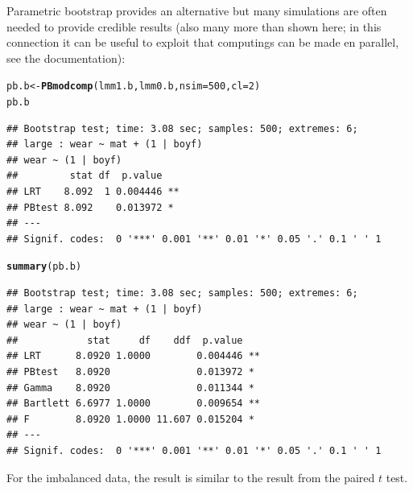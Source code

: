 \documentclass[11pt]{article}\usepackage[]{graphicx}\usepackage[]{xcolor}
\makeatletter
\newcommand{\hlnum}[1]{\textcolor[rgb]{0.686,0.059,0.569}{#1}}%
\newcommand{\hlstd}[1]{\textcolor[rgb]{0.345,0.345,0.345}{#1}}%
\newcommand{\hlkwb}[1]{\textcolor[rgb]{0.69,0.353,0.396}{#1}}%
\newcommand{\hlkwc}[1]{\textcolor[rgb]{0.333,0.667,0.333}{#1}}%
\newcommand{\hlkwd}[1]{\textcolor[rgb]{0.737,0.353,0.396}{\textbf{#1}}}%
\newenvironment{kframe}{%
 \def\at@end@of@kframe{}%
 \ifinner\ifhmode%
  \def\at@end@of@kframe{\end{minipage}}%
  \begin{minipage}{\columnwidth}%
 \fi\fi%
 \def\FrameCommand##1{\hskip\@totalleftmargin \hskip-\fboxsep
 \colorbox{shadecolor}{##1}\hskip-\fboxsep
     \hskip-\linewidth \hskip-\@totalleftmargin \hskip\columnwidth}%
 \MakeFramed {\advance\hsize-\width
   \@totalleftmargin\z@ \linewidth\hsize
   \@setminipage}}%
 {\par\unskip\endMakeFramed%
 \at@end@of@kframe}
\newenvironment{knitrout}{}{} %
\makeatother
\begin{document}
Parametric bootstrap provides an alternative but many simulations are
often needed to provide credible results (also many more than shown
here; in this connection it can be useful to exploit that computings
can be made en parallel, see the documentation):

\begin{knitrout}
\color{fgcolor}\begin{kframe}
\begin{alltt}
\hlstd{pb.b} \hlkwb{<-} \hlkwd{PBmodcomp}\hlstd{(lmm1.b, lmm0.b,} \hlkwc{nsim}\hlstd{=}\hlnum{500}\hlstd{,} \hlkwc{cl}\hlstd{=}\hlnum{2}\hlstd{)}
\hlstd{pb.b}
\end{alltt}
\begin{verbatim}
## Bootstrap test; time: 3.08 sec; samples: 500; extremes: 6;
## large : wear ~ mat + (1 | boyf)
## wear ~ (1 | boyf)
##         stat df  p.value   
## LRT    8.092  1 0.004446 **
## PBtest 8.092    0.013972 * 
## ---
## Signif. codes:  0 '***' 0.001 '**' 0.01 '*' 0.05 '.' 0.1 ' ' 1
\end{verbatim}
\end{kframe}
\end{knitrout}

\begin{knitrout}
\color{fgcolor}\begin{kframe}
\begin{alltt}
\hlkwd{summary}\hlstd{(pb.b)}
\end{alltt}
\begin{verbatim}
## Bootstrap test; time: 3.08 sec; samples: 500; extremes: 6;
## large : wear ~ mat + (1 | boyf)
## wear ~ (1 | boyf)
##            stat     df    ddf  p.value   
## LRT      8.0920 1.0000        0.004446 **
## PBtest   8.0920               0.013972 * 
## Gamma    8.0920               0.011344 * 
## Bartlett 6.6977 1.0000        0.009654 **
## F        8.0920 1.0000 11.607 0.015204 * 
## ---
## Signif. codes:  0 '***' 0.001 '**' 0.01 '*' 0.05 '.' 0.1 ' ' 1
\end{verbatim}
\end{kframe}
\end{knitrout}


For the imbalanced data, the result is similar to the result from the
paired $t$ test.
\end{document}
